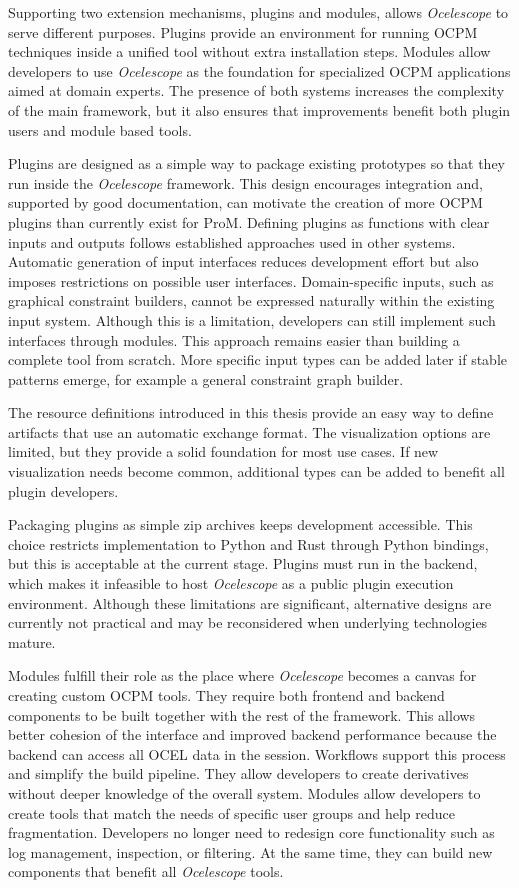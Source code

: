 Supporting two extension mechanisms, plugins and modules, allows \textit{Ocelescope} to serve different purposes.
Plugins provide an environment for running OCPM techniques inside a unified tool without extra installation steps.
Modules allow developers to use \textit{Ocelescope} as the foundation for specialized OCPM applications aimed at domain experts.
The presence of both systems increases the complexity of the main framework, but it also ensures that improvements benefit both plugin users and module based tools.

Plugins are designed as a simple way to package existing prototypes so that they run inside the \textit{Ocelescope} framework.
This design encourages integration and, supported by good documentation, can motivate the creation of more OCPM plugins than currently exist for ProM.
Defining plugins as functions with clear inputs and outputs follows established approaches used in other systems.
Automatic generation of input interfaces reduces development effort but also imposes restrictions on possible user interfaces.
Domain-specific inputs, such as graphical constraint builders, cannot be expressed naturally within the existing input system.
Although this is a limitation, developers can still implement such interfaces through modules.
This approach remains easier than building a complete tool from scratch.
More specific input types can be added later if stable patterns emerge, for example a general constraint graph builder.

The resource definitions introduced in this thesis provide an easy way to define artifacts that use an automatic exchange format.
The visualization options are limited, but they provide a solid foundation for most use cases.
If new visualization needs become common, additional types can be added to benefit all plugin developers.

Packaging plugins as simple zip archives keeps development accessible.
This choice restricts implementation to Python and Rust through Python bindings, but this is acceptable at the current stage.
Plugins must run in the backend, which makes it infeasible to host \textit{Ocelescope} as a public plugin execution environment.
Although these limitations are significant, alternative designs are currently not practical and may be reconsidered when underlying technologies mature.

Modules fulfill their role as the place where \textit{Ocelescope} becomes a canvas for creating custom OCPM tools.
They require both frontend and backend components to be built together with the rest of the framework.
This allows better cohesion of the interface and improved backend performance because the backend can access all OCEL data in the session.
Workflows support this process and simplify the build pipeline.
They allow developers to create derivatives without deeper knowledge of the overall system.
Modules allow developers to create tools that match the needs of specific user groups and help reduce fragmentation.
Developers no longer need to redesign core functionality such as log management, inspection, or filtering.
At the same time, they can build new components that benefit all \textit{Ocelescope} tools.

